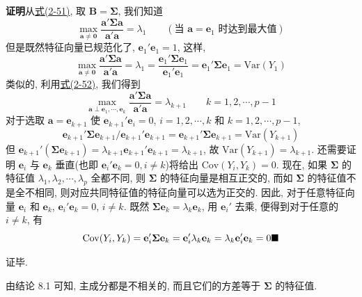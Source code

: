 \noindent\textbf{证明}\quad 从\hyperref[eq:2-51]{式(2-51)}, 取 $\mathbf{B}=\boldsymbol{\Sigma}$, 我们知道
\[
\max_{\mathbf{a}\neq\mathbf{0}}\frac{\mathbf{a}'\boldsymbol{\Sigma}\mathbf{a}}{\mathbf{a}'\mathbf{a}}=\lambda_1\qquad(\text{当 }\mathbf{a}=\mathbf{e}_1\text{ 时达到最大值})
\]
但是既然特征向量已规范化了, $\mathbf{e}_1'\mathbf{e}_1=1$, 这样,
\[
\max_{\mathbf{a}\neq\mathbf{0}}\frac{\mathbf{a}'\boldsymbol{\Sigma}\mathbf{a}}{\mathbf{a}'\mathbf{a}}=\lambda_1=\frac{\mathbf{e}_1'\boldsymbol{\Sigma}\mathbf{e}_1}{\mathbf{e}_1'\mathbf{e}_1}=\mathbf{e}_1'\boldsymbol{\Sigma}\mathbf{e}_1=\mathrm{Var}(Y_1)
\]
类似的, 利用\hyperref[eq:2-52]{式(2-52)}, 我们得到
\[
\max_{\mathbf{a}\perp\mathbf{e}_1,\cdots,\mathbf{e}_k}\frac{\mathbf{a}'\boldsymbol{\Sigma}\mathbf{a}}{\mathbf{a}'\mathbf{a}}=\lambda_{k+1}\qquad k=1,2,\cdots,p-1
\]
对于选取 $\mathbf{a}=\mathbf{e}_{k+1}$ 使 $\mathbf{e}_{k+1}'\mathbf{e}_i=0$, $i=1,2,\cdots,k$ 和 $k=1,2,\cdots,p-1$,
\[
\mathbf{e}_{k+1}'\boldsymbol{\Sigma}\mathbf{e}_{k+1}/\mathbf{e}_{k+1}'\mathbf{e}_{k+1}=\mathbf{e}_{k+1}'\boldsymbol{\Sigma}\mathbf{e}_{k+1}=\mathrm{Var}(Y_{k+1})
\]
但 $\mathbf{e}_{k+1}'(\boldsymbol{\Sigma}\mathbf{e}_{k+1})=\lambda_{k+1}\mathbf{e}_{k+1}'\mathbf{e}_{k+1}=\lambda_{k+1}$, 故 $\mathrm{Var}(Y_{k+1})=\lambda_{k+1}$. 还需要证明 $\mathbf{e}_i$ 与 $\mathbf{e}_k$ 垂直(也即 $\mathbf{e}_i'\mathbf{e}_k=0, i\neq k$)将给出 $\mathrm{Cov}(Y_i,Y_k)=0$. 现在, 如果 $\boldsymbol{\Sigma}$ 的特征值 $\lambda_1,\lambda_2,\cdots,\lambda_p$ 全都不同, 则 $\boldsymbol{\Sigma}$ 的特征向量是相互正交的, 而如 $\boldsymbol{\Sigma}$ 的特征值不是全不相同, 则对应共同特征值的特征向量可以选为正交的. 因此, 对于任意特征向量 $\mathbf{e}_i$ 和 $\mathbf{e}_k$, $\mathbf{e}_i'\mathbf{e}_k=0$, $i\neq k$. 既然 $\boldsymbol{\Sigma}\mathbf{e}_k=\lambda_k\mathbf{e}_k$, 用 $\mathbf{e}_i'$ 去乘, 便得到对于任意的 $i\neq k$, 有
\[
\mathrm{Cov}(Y_i,Y_k)=\mathbf{e}_i'\boldsymbol{\Sigma}\mathbf{e}_k=\mathbf{e}_i'\lambda_k\mathbf{e}_k=\lambda_k\mathbf{e}_i'\mathbf{e}_k=0 \hfill\blacksquare
\]

证毕.

由结论 8.1 可知, 主成分都是不相关的, 而且它们的方差等于 $\boldsymbol{\Sigma}$ 的特征值.

